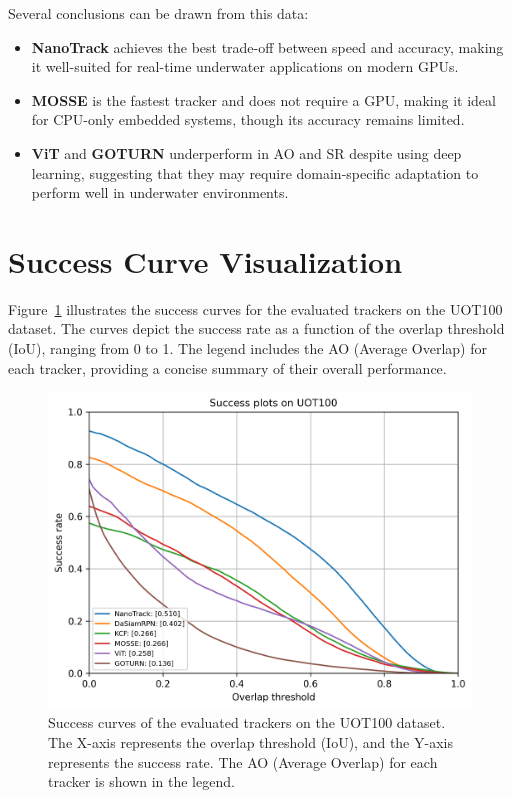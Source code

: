 Several conclusions can be drawn from this data:

\begin{itemize} \item \textbf{NanoTrack} achieves the best trade-off between speed and accuracy, making it well-suited for real-time underwater applications on modern GPUs. \item \textbf{MOSSE} is the fastest tracker and does not require a GPU, making it ideal for CPU-only embedded systems, though its accuracy remains limited. \item \textbf{ViT} and \textbf{GOTURN} underperform in AO and SR despite using deep learning, suggesting that they may require domain-specific adaptation to perform well in underwater environments. \end{itemize}


\section{Success Curve Visualization}

Figure~\ref{fig:success_curve} illustrates the success curves for the evaluated trackers on the UOT100 dataset. The curves depict the success rate as a function of the overlap threshold (IoU), ranging from 0 to 1. The legend includes the AO (Average Overlap) for each tracker, providing a concise summary of their overall performance.

\begin{figure}[ht]
    \centering
    \includegraphics[width=1\textwidth]{images/success_plot.png}
    \caption{Success curves of the evaluated trackers on the UOT100 dataset. The X-axis represents the overlap threshold (IoU), and the Y-axis represents the success rate. The AO (Average Overlap) for each tracker is shown in the legend.}
    \label{fig:success_curve}
\end{figure}

